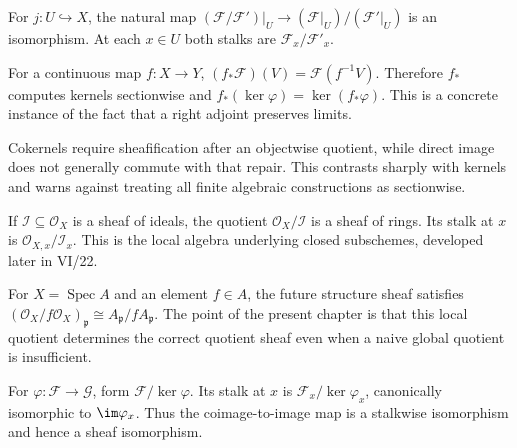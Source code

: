 \begin{example}
For $j:U\hookrightarrow X$, the natural map $(\mathcal F/\mathcal F')|_U\to(\mathcal F|_U)/(\mathcal F'|_U)$ is an isomorphism. At each $x\in U$ both stalks are $\mathcal F_x/\mathcal F'_x$.
\end{example}

\begin{example}
For a continuous map $f:X\to Y$, $(f_*\mathcal F)(V)=\mathcal F(f^{-1}V)$. Therefore $f_*$ computes kernels sectionwise and $f_*(\ker\varphi)=\ker(f_*\varphi)$. This is a concrete instance of the fact that a right adjoint preserves limits.
\end{example}

\begin{example}
Cokernels require sheafification after an objectwise quotient, while direct image does not generally commute with that repair. This contrasts sharply with kernels and warns against treating all finite algebraic constructions as sectionwise.
\end{example}

\begin{example}
If $\mathcal I\subseteq\mathcal O_X$ is a sheaf of ideals, the quotient $\mathcal O_X/\mathcal I$ is a sheaf of rings. Its stalk at $x$ is $\mathcal O_{X,x}/\mathcal I_x$. This is the local algebra underlying closed subschemes, developed later in VI/22.
\end{example}

\begin{example}
For $X=\operatorname{Spec}A$ and an element $f\in A$, the future structure sheaf satisfies $(\mathcal O_X/f\mathcal O_X)_\mathfrak p\cong A_\mathfrak p/fA_\mathfrak p$. The point of the present chapter is that this local quotient determines the correct quotient sheaf even when a naive global quotient is insufficient.
\end{example}

\begin{example}
For $\varphi:\mathcal F\to\mathcal G$, form $\mathcal F/\ker\varphi$. Its stalk at $x$ is $\mathcal F_x/\ker\varphi_x$, canonically isomorphic to $\im\varphi_x$. Thus the coimage-to-image map is a stalkwise isomorphism and hence a sheaf isomorphism.
\end{example}

